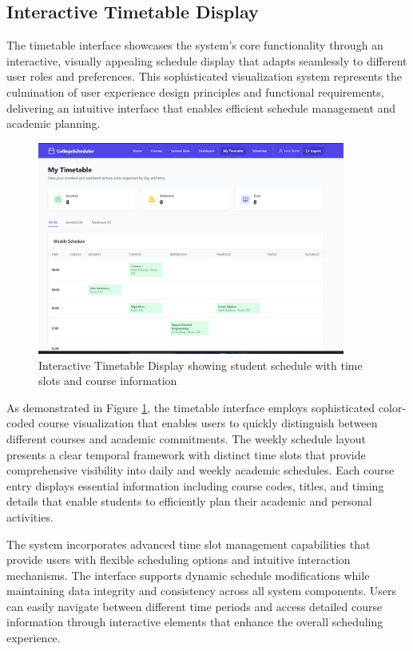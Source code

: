 \subsection{Interactive Timetable Display}

The timetable interface showcases the system's core functionality through an interactive, visually appealing schedule display that adapts seamlessly to different user roles and preferences. This sophisticated visualization system represents the culmination of user experience design principles and functional requirements, delivering an intuitive interface that enables efficient schedule management and academic planning.

\begin{figure}[htbp]
    \centering
    \includegraphics[width=0.9\textwidth]{images/Screenshot of Timetable for Student.png}
    \caption{Interactive Timetable Display showing student schedule with time slots and course information}
    \label{fig:student_timetable}
\end{figure}

As demonstrated in Figure \ref{fig:student_timetable}, the timetable interface employs sophisticated color-coded course visualization that enables users to quickly distinguish between different courses and academic commitments. The weekly schedule layout presents a clear temporal framework with distinct time slots that provide comprehensive visibility into daily and weekly academic schedules. Each course entry displays essential information including course codes, titles, and timing details that enable students to efficiently plan their academic and personal activities.

The system incorporates advanced time slot management capabilities that provide users with flexible scheduling options and intuitive interaction mechanisms. The interface supports dynamic schedule modifications while maintaining data integrity and consistency across all system components. Users can easily navigate between different time periods and access detailed course information through interactive elements that enhance the overall scheduling experience.

